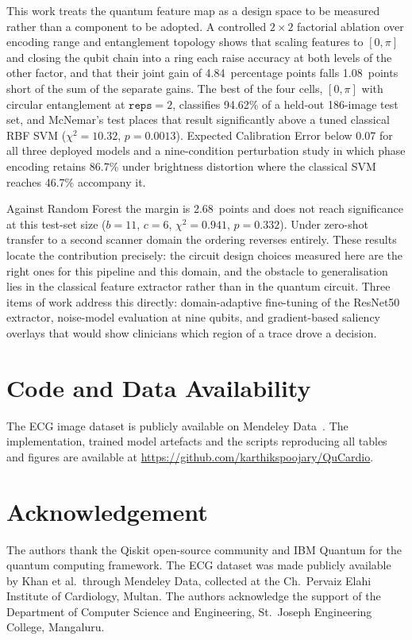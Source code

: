 \documentclass[10pt,conference]{IEEEtran}
\begin{document}
This work treats the quantum feature map as a design space to be
measured rather than a component to be adopted. A controlled
$2\!\times\!2$ factorial ablation over encoding range and entanglement
topology shows that scaling features to $[0,\pi]$ and closing the qubit
chain into a ring each raise accuracy at both levels of the other
factor, and that their joint gain of 4.84~percentage points falls
1.08~points short of the sum of the separate gains. The best of the
four cells, $[0,\pi]$ with circular entanglement at
$\texttt{reps}\!=\!2$, classifies 94.62\% of a held-out 186-image test
set, and McNemar's test places that result significantly above a tuned
classical RBF SVM ($\chi^2\!=\!10.32$, $p\!=\!0.0013$). Expected
Calibration Error below 0.07 for all three deployed models and a
nine-condition perturbation study in which phase encoding retains 86.7\%
under brightness distortion where the classical SVM reaches 46.7\%
accompany it.

Against Random Forest the margin is 2.68~points and does not reach
significance at this test-set size ($b\!=\!11$, $c\!=\!6$,
$\chi^2\!=\!0.941$, $p\!=\!0.332$). Under zero-shot transfer to a
second scanner domain the ordering reverses entirely. These results
locate the contribution precisely: the circuit design choices measured
here are the right ones for this pipeline and this domain, and the
obstacle to generalisation lies in the classical feature extractor
rather than in the quantum circuit. Three items of work address this
directly: domain-adaptive fine-tuning of the ResNet50 extractor,
noise-model evaluation at nine qubits, and gradient-based saliency
overlays that would show clinicians which region of a trace drove a
decision.

\section*{Code and Data Availability}

The ECG image dataset is publicly available on Mendeley
Data~\cite{khan2021}. The implementation, trained model artefacts and
the scripts reproducing all tables and figures are available at
\url{https://github.com/karthikspoojary/QuCardio}.

\section*{Acknowledgement}

The authors thank the Qiskit open-source community and IBM Quantum for
the quantum computing framework. The ECG dataset was made publicly
available by Khan et al.\ through Mendeley Data, collected at the
Ch.\ Pervaiz Elahi Institute of Cardiology, Multan. The authors
acknowledge the support of the Department of Computer Science and
Engineering, St.\ Joseph Engineering College, Mangaluru.



\end{document}
